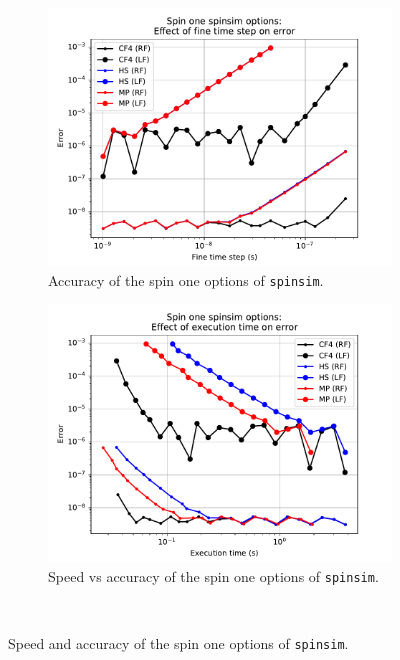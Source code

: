\documentclass{jors}
\begin{document}
			\begin{figure}[h!]
				\begin{subfigure}[b]{0.45\textwidth}
					\includegraphics[scale=0.45]{benchmark_spin_one_step_error.pdf}
					\caption{Accuracy of the spin one options of \texttt{spinsim}.}
					\label{fig:benchmark_spin_one_step_error}
				\end{subfigure}
				\hfill
				\begin{subfigure}[b]{0.45\textwidth}
					\includegraphics[scale=0.45]{benchmark_spin_one_execution_error.pdf}
					\caption{Speed vs accuracy of the spin one options of \texttt{spinsim}.}
					\label{fig:benchmark_spin_one_execution_error}
				\end{subfigure}\
				\caption{Speed and accuracy of the spin one options of \texttt{spinsim}.}
				\label{fig:benchmark_spin_one}
			\end{figure}
\end{document}
